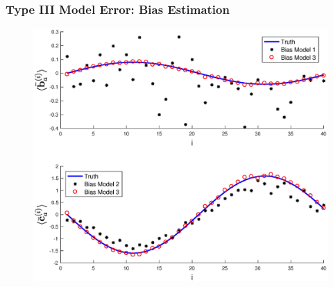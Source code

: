 \documentclass{beamer}
\begin{document}
\begin{frame}
\frametitle{Type III Model Error: Bias Estimation}
\begin{figure} 
\centering
\includegraphics[scale=0.4]{Figures/BiasEstM3}
\end{figure}
\end{frame}
\end{document}
